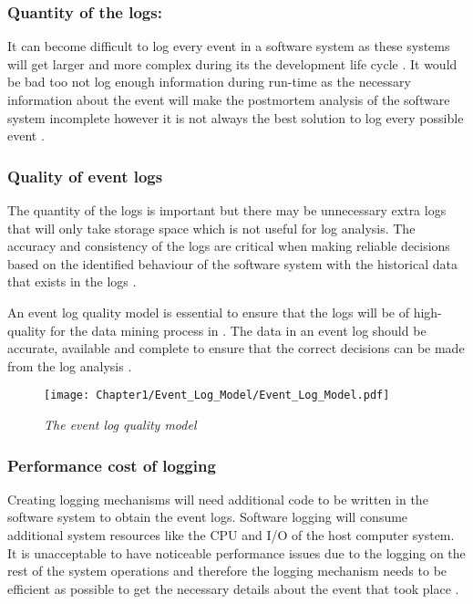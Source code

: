 \subsubsection{Quantity of the logs:} 
It can become difficult to log every event in a software system as these systems will get larger and more complex during its the development life cycle \cite{Stojanov2017}. It would be bad too not log enough information during run-time as the necessary information about the event will make the postmortem analysis of the software system incomplete however it is not always the best solution to log every possible event \cite{Zhu2015, Jans2012}.

\subsubsection{Quality of event logs} 
The quantity of the logs is important but there may be unnecessary extra logs that will only take storage space which is not useful for log analysis. The accuracy and consistency of the logs are critical when making reliable decisions based on the identified behaviour of the software system with the historical data that exists in the logs \cite{Stojanov2017,Kherbouche2017}.\par An event log quality model is essential to ensure that the logs will be of high-quality for the data mining process in . The data in an event log should be accurate, available and complete to ensure that the correct decisions can be made from the log analysis \cite{Kherbouche2017, VanDerAalst2011}.

\begin{figure}[!htb] %
	\centering %
	\texttt{[image: Chapter1/Event\_Log\_Model/Event\_Log\_Model.pdf]}
	\caption[The event log quality model]
	{\textit{The event log quality model \cite{Kherbouche2017}}} \label{fig:EventQModel}
\end{figure}

\subsubsection{Performance cost of logging} 
Creating logging mechanisms will need additional code to be written in the software system to obtain the event logs. Software logging will consume additional system resources like the CPU and I/O of the host computer system. It is unacceptable to have noticeable performance issues due to the logging on the rest of the system operations and therefore the logging mechanism needs to be efficient as possible to get the necessary details about the event that took place \cite{Zhu2015,Zhu2019}. 

